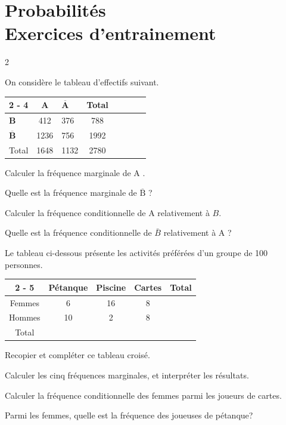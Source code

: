 \documentclass[11pt,a4paper]{book}
\begin{document}
\graphicspath{{images/}}
\setcounter{chapter}{3}
\chapter[ Probabilités - Exercices]{Probabilités \\ Exercices d'entrainement}
\thispagestyle{fancy}

\begin{multicols}{2}

On considère le tableau d'effectifs suivant.

\begin{tabular}{|Xc|Xc|Xc|Xc|}
	\cline { 2 - 4 } \multicolumn{1}{c|}{} & $\mathbf{A}$ & $\overline{\mathbf{A}}$ & Total \\
	\hline $\mathbf{B}$ & 412 & 376 & 788 \\
	\hline$\overline{\mathbf{B}}$ & 1236 & 756 & 1992 \\
	\hline Total & 1648 & 1132 & 2780 \\
	\hline
\end{tabular}
\begin{enumMet}
	\item Calculer la fréquence marginale de A .
	\item Quelle est la fréquence marginale de $\overline{\mathrm{B}}$ ?
	\item Calculer la fréquence conditionnelle de A relativement à $B$.
	\item Quelle est la fréquence conditionnelle de $\bar{B}$ relativement à A ?
\end{enumMet}

\columnbreak


Le tableau ci-dessous présente les activités préférées d'un groupe de 100 personnes.

\setlength{\tabcolsep}{0.25cm}
\begin{tabular}{|c|c|c|c|c|}
	\cline { 2 - 5 } \multicolumn{1}{c|}{} & Pétanque & Piscine & Cartes & Total \\
	\hline Femmes & 6 & 16 & 8 & \\
	\hline Hommes & 10 & 2 & 8 & \\
	\hline Total & & & & \\
	\hline
\end{tabular}
\begin{enumMet}
	\item Recopier et compléter ce tableau croisé.
	\item Calculer les cinq fréquences marginales, et interpréter les résultats.
	\item \begin{enumMet}
		\item Calculer la fréquence conditionnelle des femmes parmi les joueurs de cartes.
		\item Parmi les femmes, quelle est la fréquence des joueuses de pétanque?
\end{enumMet}
\end{enumMet}
\end{multicols}
\end{document}
